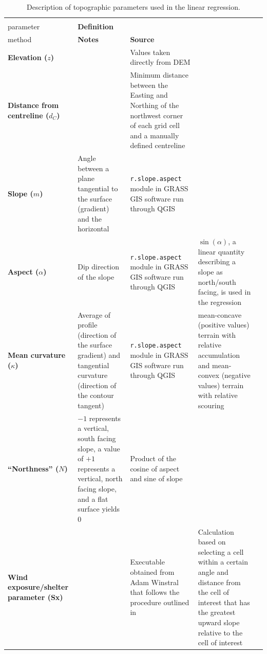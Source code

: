 \documentclass[twocolumn, letterpaper]{igs}
\begin{document}
\begin{table}[!htbp]
\centering%
\caption{Description of topographic parameters used in the linear regression.}
\label{tab:TopoParams}
\begin{tabularx}{\linewidth}{XXXXX}
\midrule
\textbf{\begin{tabular}[c]{@{}l@{}}Topographic\\ parameter\end{tabular}} & \textbf{Definition} & \textbf{\begin{tabular}[c]{@{}l@{}}Calculation \\ method\end{tabular}} & \textbf{Notes} & \textbf{Source} \\ \midrule
\textbf{Elevation ($z$)} &  & Values taken directly from DEM &  &  \\
\textbf{Distance from centreline ($d_C$)} &  & Minimum distance between the Easting and Northing of the northwest corner of each grid cell and a manually defined centreline &  &  \\
\textbf{Slope ($m$)} & Angle between a plane tangential to the surface (gradient) and the horizontal & \texttt{r.slope.aspect} module in GRASS GIS software run through QGIS &  & \cite{Mitavsova1993, Hofierka2009, Olaya2009} \\
\textbf{Aspect ($\alpha$)} & Dip direction of the slope & \texttt{r.slope.aspect} module in GRASS GIS software run through QGIS & $\sin(\alpha)$, a linear quantity describing a slope as north/south facing, is used in the regression & \cite{Mitavsova1993, Hofierka2009, Olaya2009} \\
\textbf{Mean curvature ($\kappa$)} & Average of profile (direction of the surface gradient) and tangential curvature (direction of the contour tangent) & \texttt{r.slope.aspect} module in GRASS GIS software run through QGIS & mean-concave (positive values) terrain with relative accumulation and mean-convex (negative values) terrain with relative scouring & \cite{Mitavsova1993, Hofierka2009, Olaya2009} \\
\textbf{``Northness'' ($N$)} & $-1$ represents a vertical, south facing slope, a value of $+1$ represents a vertical, north facing slope, and a flat surface yields 0 & Product of the cosine of aspect and sine of slope &  & \cite{Molotch2005} \\
\textbf{Wind exposure/shelter parameter (Sx)} &  & Executable obtained from Adam Winstral that follows the procedure outlined in \cite{Winstral2002} & Calculation based on selecting a cell within a certain angle and distance from the cell of interest that has the greatest upward slope relative to the cell of interest & \cite{Winstral2002}
\end{tabularx}
\end{table}
\end{document}
